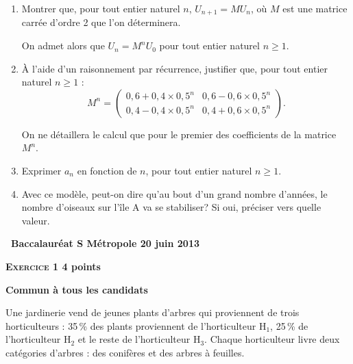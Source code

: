 \documentclass[10pt]{article}
\begin{document}
\begin{enumerate}
\item Montrer que, pour tout entier naturel $n$, $U_{n+1}=MU_{n}$, où $M$ est une matrice carrée d'ordre 2 que l'on déterminera.

On admet alors que $U_{n}=M^{n}U_{0}$ pour tout entier naturel $n\geqslant 1$.
\item À l'aide d'un raisonnement par récurrence, justifier que, pour tout  entier naturel $n\geqslant 1$ : 
\[M^{n}= \begin{pmatrix}
0,6 + 0,4\times 0,5^{n}&0,6 - 0,6\times 0,5^{n}\\
0,4 - 0,4\times 0,5^{n}&0,4 + 0,6\times 0,5^{n}
\end{pmatrix}.\]

On ne détaillera le calcul que pour le premier des coefficients de la matrice $M^{n}$.

\item Exprimer $a_{n}$ en fonction de $n$, pour tout entier naturel $n\geqslant 1$.

\item Avec ce modèle, peut-on dire qu'au bout d'un grand nombre d'années, le nombre d'oiseaux sur l'île A va se stabiliser? Si oui, préciser vers quelle valeur.
\end{enumerate}
\label{fin}
\newpage
\hypertarget{Metropole}{}

\pagestyle{fancy}
\thispagestyle{empty}
\begin{center}
{\Large \textbf{\decofourleft~Baccalauréat S Métropole 20 juin 2013~\decofourright}}
\end{center}

\vspace{0,25cm}

\textbf{\textsc{Exercice 1} \hfill 4 points} %
 
\textbf{Commun à tous les candidats}

\medskip

Une jardinerie vend de jeunes plants d'arbres qui proviennent de trois horticulteurs : 35\,\% des plants proviennent de l'horticulteur H$_{1}$, 25\,\% de l'horticulteur H$_{2}$ et le reste de l'horticulteur H$_{3}$. Chaque horticulteur livre deux catégories d'arbres : des conifères et des arbres à feuilles.
 
\end{document}
